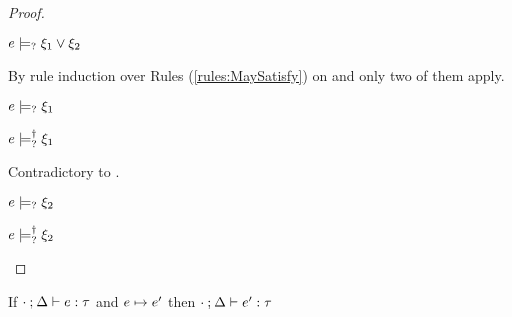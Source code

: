 \begin{proof}
\begin{byCases}
  \item[\text{(\ref{rule:CMSPossibly})}]
    \begin{pfsteps*}
    \item $e \models_{?} \xi_1 \vee \xi_2$  
    \end{pfsteps*}
    By rule induction over Rules (\ref{rules:MaySatisfy}) on  and only two of them apply.
    \begin{byCases}
    \item[\text{(\ref{rule:CPSOr1})}]
      \begin{pfsteps*}
      \item $e \models_{?} \xi_1$  
      \item $e \models_{?}^{\dag} \xi_1$ 
      \end{pfsteps*}
      Contradictory to .
    \item[\text{(\ref{rule:CPSOr2})}]
      \begin{pfsteps*}
      \item $e \models_{?} \xi_2$  
      \item $e \models_{?}^{\dag} \xi_2$ 
      \end{pfsteps*}
    \end{byCases}
  \end{byCases}
\end{proof}

\begin{thm}[Preservation]
  \label{thrm:preservation}
  If $\cdot \mathbin{;} \Delta \vdash e : \tau$ and $e \mapsto e'$
  then $\cdot \mathbin{;} \Delta \vdash e' : \tau$
\end{thm}

